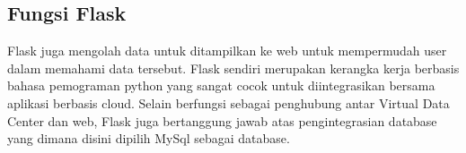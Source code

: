 \subsection{Fungsi Flask}
Flask juga mengolah data untuk ditampilkan ke web untuk mempermudah user dalam memahami data tersebut. Flask sendiri merupakan kerangka kerja berbasis bahasa pemograman python yang sangat cocok untuk diintegrasikan bersama aplikasi berbasis cloud. Selain berfungsi sebagai penghubung antar Virtual Data Center dan web, Flask juga bertanggung jawab atas pengintegrasian database yang dimana disini dipilih MySql sebagai database\cite{alauddin2017implementasi}.